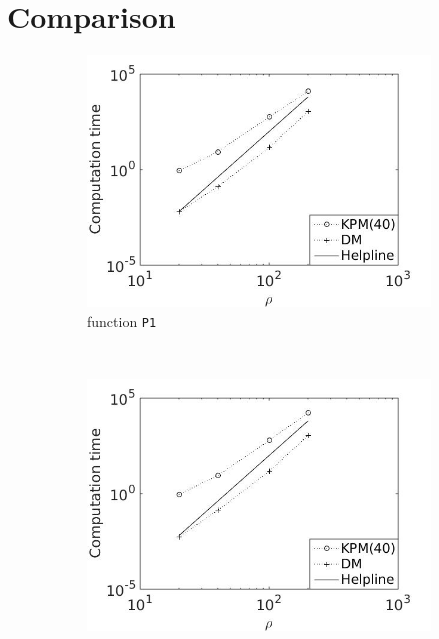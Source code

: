 \section{Comparison}
\begin{figure}[H]
        \centering
        \begin{subfigure}[b]{0.45\textwidth}
                \includegraphics[width=\textwidth]{fig/c1comp1m}
                \caption{function \texttt{P1}}
                \label{fig:c1comp1m}
        \end{subfigure}%
        ~
        \begin{subfigure}[b]{0.45\textwidth}
                \includegraphics[width=\textwidth]{fig/c2comp2m}

\end{subfigure}
\end{figure}
